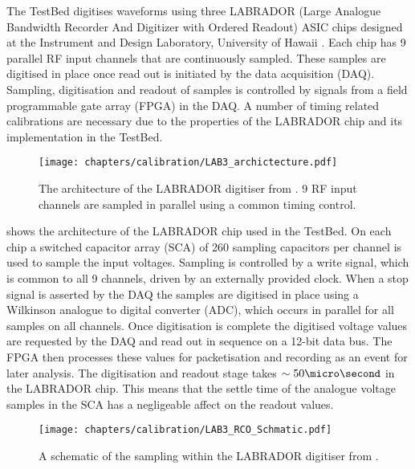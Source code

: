 The TestBed digitises waveforms using three LABRADOR (Large Analogue Bandwidth Recorder And Digitizer with Ordered Readout) ASIC chips designed at the Instrument and Design Laboratory, University of Hawaii \cite{Varner2007447}. Each chip has 9 parallel RF input channels that are continuously sampled. These samples are digitised in place once read out is initiated by the data acquisition (DAQ). Sampling, digitisation and readout of samples is controlled by signals from a field programmable gate array (FPGA) in the DAQ. A number of timing related calibrations are necessary due to the properties of the LABRADOR chip and its implementation in the TestBed. 

\begin{figure}[htpb]
  \texttt{[image: chapters/calibration/LAB3\_archictecture.pdf]}
  \caption{The architecture of the LABRADOR digitiser from \cite{Varner2007447}. 9 RF input channels are sampled in parallel using a common timing control.}
  \label{fig:calibration:LABRADOR-Digitiser-Chip:Architecture}
\end{figure}

 shows the architecture of the LABRADOR chip used in the TestBed. On each chip a switched capacitor array (SCA) of 260 sampling capacitors per channel is used to sample the input voltages. Sampling is controlled by a write signal, which is common to all 9 channels, driven by an externally provided clock. When a stop signal is asserted by the DAQ the samples are digitised in place using a Wilkinson analogue to digital converter (ADC), which occurs in parallel for all samples on all channels. Once digitisation is complete the digitised voltage values are requested by the DAQ and read out in sequence on a 12-bit data bus. The FPGA then processes these values for packetisation and recording as an event for later analysis. The digitisation and readout stage takes $\sim 50 \micro \second$ in the LABRADOR chip. This means that the settle time of the analogue voltage samples in the SCA has a negligeable affect on the readout values.



\begin{figure}[htpb]
  \texttt{[image: chapters/calibration/LAB3\_RCO\_Schmatic.pdf]}
  \caption{A schematic of the sampling within the LABRADOR digitiser from \cite{Varner2007447}.}
  \label{fig:calibration:LABRADOR-Digitiser-Chip:Schematic}
\end{figure}



